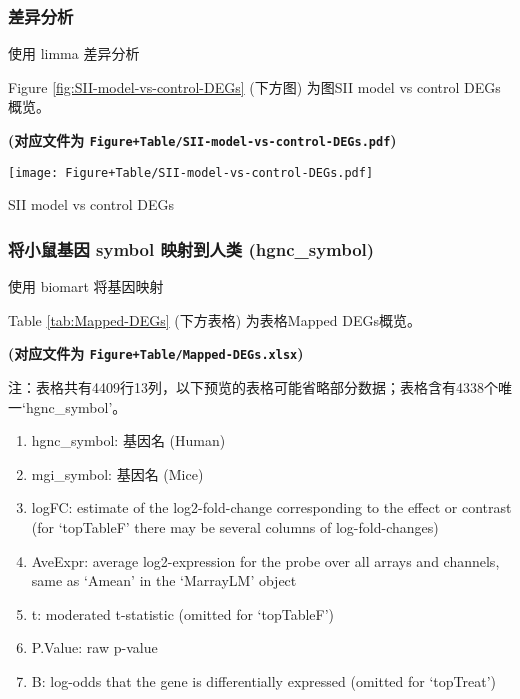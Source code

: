 \documentclass[
]{article}
\providecommand{\tightlist}{%
  \setlength{\itemsep}{0pt}\setlength{\parskip}{0pt}}
\begin{document}
\hypertarget{ux5deeux5f02ux5206ux6790}{%
\subsubsection{差异分析}\label{ux5deeux5f02ux5206ux6790}}

使用 limma 差异分析

Figure \ref{fig:SII-model-vs-control-DEGs} (下方图) 为图SII model vs control DEGs概览。

\textbf{(对应文件为 \texttt{Figure+Table/SII-model-vs-control-DEGs.pdf})}

\def\@captype{figure}
\begin{center}
\texttt{[image: Figure+Table/SII-model-vs-control-DEGs.pdf]}
\caption{SII model vs control DEGs}\label{fig:SII-model-vs-control-DEGs}
\end{center}

\hypertarget{ux5c06ux5c0fux9f20ux57faux56e0-symbol-ux6620ux5c04ux5230ux4ebaux7c7b-hgnc_symbol}{%
\subsubsection{将小鼠基因 symbol 映射到人类 (hgnc\_symbol)}\label{ux5c06ux5c0fux9f20ux57faux56e0-symbol-ux6620ux5c04ux5230ux4ebaux7c7b-hgnc_symbol}}

使用 biomart 将基因映射

Table \ref{tab:Mapped-DEGs} (下方表格) 为表格Mapped DEGs概览。

\textbf{(对应文件为 \texttt{Figure+Table/Mapped-DEGs.xlsx})}

\begin{center}\begin{tcolorbox}[colback=gray!10, colframe=gray!50, width=0.9\linewidth, arc=1mm, boxrule=0.5pt]注：表格共有4409行13列，以下预览的表格可能省略部分数据；表格含有4338个唯一`hgnc\_symbol'。
\end{tcolorbox}
\end{center}
\begin{center}\begin{tcolorbox}[colback=gray!10, colframe=gray!50, width=0.9\linewidth, arc=1mm, boxrule=0.5pt]\begin{enumerate}\tightlist
\item hgnc\_symbol:  基因名 (Human)
\item mgi\_symbol:  基因名 (Mice)
\item logFC:  estimate of the log2-fold-change corresponding to the effect or contrast (for ‘topTableF’ there may be several columns of log-fold-changes)
\item AveExpr:  average log2-expression for the probe over all arrays and channels, same as ‘Amean’ in the ‘MarrayLM’ object
\item t:  moderated t-statistic (omitted for ‘topTableF’)
\item P.Value:  raw p-value
\item B:  log-odds that the gene is differentially expressed (omitted for ‘topTreat’)
\end{enumerate}\end{tcolorbox}
\end{center}
\end{document}
